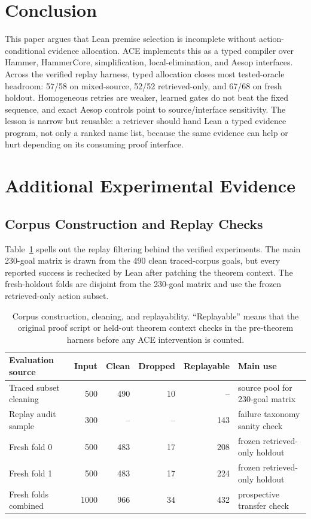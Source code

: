 \documentclass{article}
\newcommand{\tap}{\textsc{ACE}}
\begin{document}
\section{Conclusion}

This paper argues that Lean premise selection is incomplete without action-conditional evidence allocation. \tap{} implements this as a typed compiler over Hammer, HammerCore, simplification, local-elimination, and Aesop interfaces. Across the verified replay harness, typed allocation closes most tested-oracle headroom: 57/58 on mixed-source, 52/52 retrieved-only, and 67/68 on fresh holdout. Homogeneous retries are weaker, learned gates do not beat the fixed sequence, and exact Aesop controls point to source/interface sensitivity. The lesson is narrow but reusable: a retriever should hand Lean a typed evidence program, not only a ranked name list, because the same evidence can help or hurt depending on its consuming proof interface.

\newpage



\appendix

\section{Additional Experimental Evidence}

\subsection{Corpus Construction and Replay Checks}

Table~\ref{tab:appendix-corpus} spells out the replay filtering behind the verified experiments. The main 230-goal matrix is drawn from the 490 clean traced-corpus goals, but every reported success is rechecked by Lean after patching the theorem context. The fresh-holdout folds are disjoint from the 230-goal matrix and use the frozen retrieved-only action subset.

\begin{table}[H]
\caption{Corpus construction, cleaning, and replayability. ``Replayable'' means that the original proof script or held-out theorem context checks in the pre-theorem harness before any \tap{} intervention is counted.}
\label{tab:appendix-corpus}
\centering
\small
\begin{tabular}{lrrrrl}
\toprule
Evaluation source & Input & Clean & Dropped & Replayable & Main use \\
\midrule
Traced subset cleaning & 500 & 490 & 10 & -- & source pool for 230-goal matrix \\
Replay audit sample & 300 & -- & -- & 143 & failure taxonomy sanity check \\
Fresh fold 0 & 500 & 483 & 17 & 208 & frozen retrieved-only holdout \\
Fresh fold 1 & 500 & 483 & 17 & 224 & frozen retrieved-only holdout \\
Fresh folds combined & 1000 & 966 & 34 & 432 & prospective transfer check \\
\bottomrule
\end{tabular}
\end{table}
\end{document}
